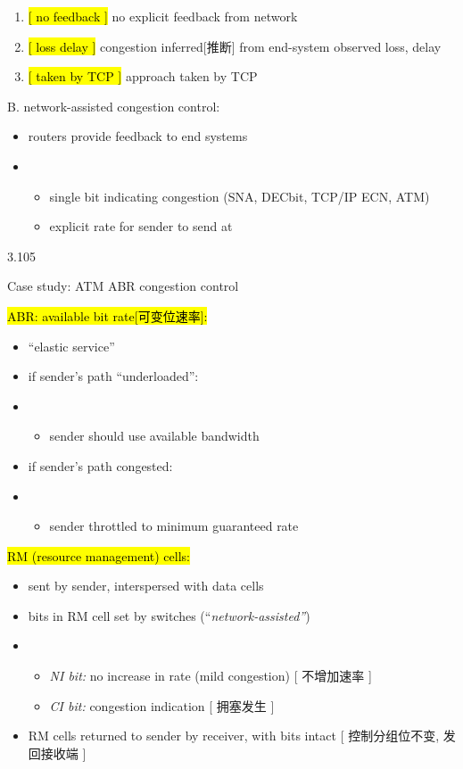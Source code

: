 \documentclass[
]{article}
\begin{document}
\begin{enumerate}
\def\labelenumi{\arabic{enumi}.}
\item
  \hl{{[} no feedback {]}} no explicit feedback from network
\item
  \hl{{[} loss delay {]}} congestion inferred{[}推断{]} from end-system
  observed loss, delay
\item
  \hl{{[} taken by TCP {]}} approach taken by TCP
\end{enumerate}

B. network-assisted congestion control:

\begin{itemize}
\item
  routers provide feedback to end systems
\item
  \begin{itemize}
  \item
    single bit indicating congestion (SNA, DECbit, TCP/IP ECN, ATM)
  \item
    explicit rate for sender to send at
  \end{itemize}
\end{itemize}

3.105

Case study: ATM ABR congestion control

\hl{ABR: available bit rate{[}可变位速率{]}:}

\begin{itemize}
\item
  ``elastic service''
\item
  if sender's path ``underloaded'':
\item
  \begin{itemize}
  \item
    sender should use available bandwidth
  \end{itemize}
\item
  if sender's path congested:
\item
  \begin{itemize}
  \item
    sender throttled to minimum guaranteed rate
  \end{itemize}
\end{itemize}

\hl{RM (resource management) cells:}

\begin{itemize}
\item
  sent by sender, interspersed with data cells
\item
  bits in RM cell set by switches (``\emph{network-assisted''})
\item
  \begin{itemize}
  \item
    \emph{NI bit:} no increase in rate (mild congestion) {[} 不增加速率
    {]}
  \item
    \emph{CI bit:} congestion indication {[} 拥塞发生 {]}
  \end{itemize}
\item
  RM cells returned to sender by receiver, with bits intact {[}
  控制分组位不变, 发回接收端 {]}
\end{itemize}
\end{document}
